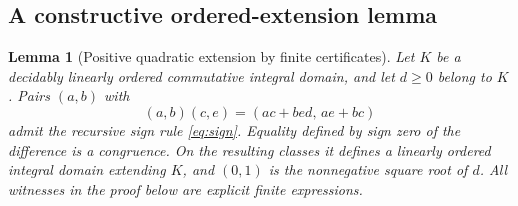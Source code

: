\documentclass[11pt,a4paper]{article}
\newtheorem{lemma}[theorem]{Lemma}
\theoremstyle{definition}
\begin{document}
\subsection{A constructive ordered-extension lemma}
\begin{lemma}[Positive quadratic extension by finite certificates]
\label{lem:orderedextension}
Let \(K\) be a decidably linearly ordered commutative integral domain,
and let \(d\ge0\) belong to \(K\). Pairs \((a,b)\) with
\[
 (a,b)(c,e)=(ac+bed,\,ae+bc)
\]
admit the recursive sign rule \eqref{eq:sign}. Equality defined by sign
zero of the difference is a congruence. On the resulting classes it
defines a linearly ordered integral domain extending \(K\), and
\((0,1)\) is the nonnegative square root of \(d\).
All witnesses in the proof below are explicit finite expressions.
\end{lemma}
\end{document}

